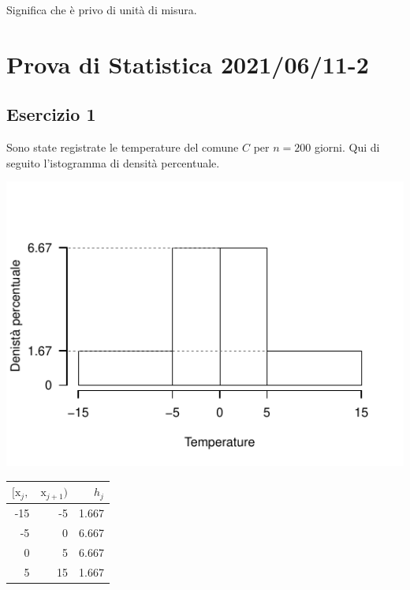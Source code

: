 \documentclass[
  11pt,
]{book}
\theoremstyle{mytheoremstyle}
\theoremstyle{mydefstyle}
\newenvironment{sol}
  {
  \begin{tcolorbox}[enhanced,breakable,arc=0.1mm,boxrule=1pt,colback=white,colframe=iblue,
  title=\bf \fontfamily{lmss}\selectfont \hspace{.5 cm} Soluzione,drop fuzzy shadow]

}{
\end{tcolorbox}
  }
\begin{document}
\begin{sol}
Significa che è privo di unità di misura.

\end{sol}

\section{Prova di Statistica 2021/06/11-2}\label{prova-di-statistica-20210611-2}

\subsection{Esercizio 1}\label{esercizio-1-4}

Sono state registrate le temperature del comune \(C\) per \(n=200\) giorni. Qui di seguito l'istogramma di densità percentuale.

\begin{center}\includegraphics{Esami_passati_con_soluzioni_files/figure-latex/2021-46-1} \end{center}

\begin{table}[H]
\centering
\begin{tabular}[t]{rrr}
\toprule
$[\text{x}_j,$ & $\text{x}_{j+1})$ & $h_j$\\
\midrule
-15 & -5 & 1.667\\
-5 & 0 & 6.667\\
0 & 5 & 6.667\\
5 & 15 & 1.667\\
\bottomrule
\end{tabular}
\end{table}
\end{document}
